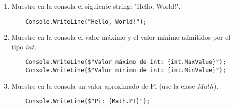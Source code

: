 \begin{enumerate}
	\item Muestre en la consola el siguiente string: "Hello, World!".
        \begin{lstlisting}
    Console.WriteLine("Hello, World!");
        \end{lstlisting}
	\item Muestre en la consola el valor máximo y el valor mínimo admitidos por el tipo $int$.
        \begin{lstlisting}
    Console.WriteLine($"Valor máximo de int: {int.MaxValue}");
    Console.WriteLine($"Valor mínimo de int: {int.MinValue}");
        \end{lstlisting}
	\item Muestre en la consola un valor aproximado de Pi (use la clase $Math$).
         \begin{lstlisting}
    Console.WriteLine($"Pi: {Math.PI}");
        \end{lstlisting}
\end{enumerate}